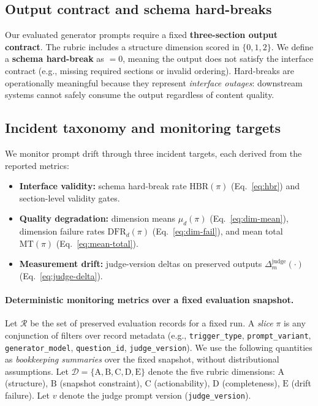 \documentclass{article}
\begin{document}
\subsection{Output contract and schema hard-breaks}
Our evaluated generator prompts require a fixed \textbf{three-section output contract}.
The rubric includes a structure dimension \Astruct{} scored in $\{0,1,2\}$.
We define a \textbf{schema hard-break} as \Astruct$=0$, meaning the output does not satisfy the interface contract (e.g., missing required sections or invalid ordering).
Hard-breaks are operationally meaningful because they represent \emph{interface outages}: downstream systems cannot safely consume the output regardless of content quality.

\subsection{Incident taxonomy and monitoring targets}
We monitor prompt drift through three incident targets, each derived from the reported metrics:
\begin{itemize}[leftmargin=1.2em, itemsep=2pt, topsep=2pt]
  \item \textbf{Interface validity:} schema hard-break rate $\mathrm{HBR}(\pi)$ (Eq.~\ref{eq:hbr}) and section-level validity gates.
  \item \textbf{Quality degradation:} dimension means $\mu_d(\pi)$ (Eq.~\ref{eq:dim-mean}), dimension failure rates $\mathrm{DFR}_d(\pi)$ (Eq.~\ref{eq:dim-fail}), and mean total $\mathrm{MT}(\pi)$ (Eq.~\ref{eq:mean-total}).
  \item \textbf{Measurement drift:} judge-version deltas on preserved outputs $\Delta^{\text{judge}}_{m}(\cdot)$ (Eq.~\ref{eq:judge-delta}).
\end{itemize}

\paragraph{Deterministic monitoring metrics over a fixed evaluation snapshot.}
Let $\mathcal{R}$ be the set of preserved evaluation records for a fixed run.
A \emph{slice} $\pi$ is any conjunction of filters over record metadata (e.g., \texttt{trigger\_type}, \texttt{prompt\_variant}, \texttt{generator\_model}, \texttt{question\_id}, \texttt{judge\_version}).
We use the following quantities as \emph{bookkeeping summaries} over the fixed snapshot, without distributional assumptions.
Let $\mathcal{D}=\{\mathrm{A},\mathrm{B},\mathrm{C},\mathrm{D},\mathrm{E}\}$ denote the five rubric dimensions:
$\mathrm{A}$ (structure), $\mathrm{B}$ (snapshot constraint), $\mathrm{C}$ (actionability),
$\mathrm{D}$ (completeness), $\mathrm{E}$ (drift failure).
Let $v$ denote the judge prompt version (\texttt{judge\_version}).
\end{document}
